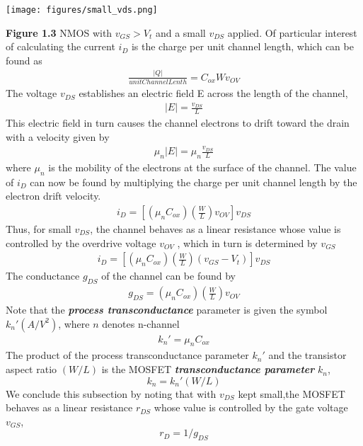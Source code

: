 \documentclass[12pt]{article}
\begin{document}
    \begin{center}
        \texttt{[image: figures/small\_vds.png]}
    \end{center}
    \textbf{Figure 1.3} NMOS with $v_{GS} > V_t$ and a small $v_{DS}$ applied.
    Of particular interest of calculating the current $i_D$ is the charge per
    unit channel length, which can be found as
    \begin{align}
        \frac{|Q|}{unitChannelLenth} = C_{ox}Wv_{OV}
    \end{align}
    The voltage $v_{DS}$ establishes an electric field E across the length of the channel,
    \begin{align}
        |E| = \frac{v_{DS}}{L}
    \end{align}
    This electric field in turn causes the channel electrons to drift toward the drain with 
    a velocity given by
    \begin{align}
        \mu_n|E| = \mu_n\frac{v_{DS}}{L}
    \end{align}
    where $\mu_n$ is the mobility of the electrons at the surface of the channel. The value 
    of $i_D$ can now be found by multiplying the charge per unit channel length by the electron
    drift velocity.
    \begin{align}
        i_D = \left[(\mu_nC_{ox})\left(\frac{W}{L}\right)v_{OV}\right]v_{DS}
    \end{align}
    Thus, for small $v_{DS}$, the channel behaves as a linear resistance whose value is controlled 
    by the overdrive voltage $v_{OV}$ , which in turn is determined by $v_{GS}$
    \begin{align}
        i_D = \left[(\mu_nC_{ox})\left(\frac{W}{L}\right)(v_{GS}-V_t)\right]v_{DS}
    \end{align}
    The conductance $g_{DS}$ of the channel can be found by
    \begin{align}
        g_{DS} = (\mu_nC_{ox})\left(\frac{W}{L}\right)v_{OV}
    \end{align}
    Note that the \textit{\textbf{process transconductance}} parameter is given the symbol 
    $k_n' (A/V^2)$, where $n$ denotes n-channel
    \begin{align}
        k_n' = \mu_nC_{ox} 
    \end{align}
    The product of the process transconductance parameter $k_n'$ and the transistor aspect ratio
    $(W/L)$ is the MOSFET \textit{\textbf{transconductance parameter}} $k_n$,
    $$k_n = k_n'(W/L)$$
    We conclude this subsection by noting that with $v_{DS}$ kept small,the MOSFET behaves as a 
    linear resistance $r_{DS}$ whose value is controlled by the gate voltage $v_{GS}$,
    $$r_D = 1/g_{DS}$$
\end{document}
